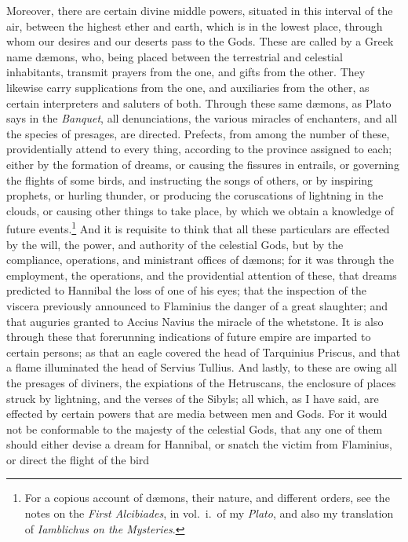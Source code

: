 \documentclass[twoside]{article}
\begin{document}
Moreover, there are certain divine middle powers, situated in this interval of
the air, between the highest ether and earth, which is in the lowest place,
through whom our desires and our deserts pass to the Gods.  These are called by
a Greek name d{\ae}mons, who, being placed between the terrestrial and
celestial inhabitants, transmit prayers from the one, and gifts from the other.
They likewise carry supplications from the one, and auxiliaries from the other,
as certain interpreters and saluters of both. Through these same d{\ae}mons, as
Plato says in the \textit{Banquet}, all denunciations, the various miracles of
enchanters, and all the species of presages, are directed.  Prefects, from
among the number of these, providentially attend to every thing, according to
the province assigned to each; either by the formation of dreams, or causing
the fissures in entrails, or governing the flights of some birds, and
instructing the songs of others, or by inspiring prophets, or hurling thunder,
or producing the coruscations of lightning in the clouds, or causing other
things to take place, by which we obtain a knowledge of future
events.\footnote{For a copious account of d{\ae}mons, their nature, and
different orders, see the notes on the \textit{First Alcibiades}, in vol.~i.~of
my \textit{Plato}, and also my translation of \textit{Iamblichus on the
Mysteries}.} And it is requisite to think that all these particulars are
effected by the will, the power, and authority of the celestial Gods, but by
the compliance, operations, and ministrant offices of d{\ae}mons; for it was
through the employment, the operations, and the providential attention of
these, that dreams predicted to Hannibal the loss of one of his eyes; that the
inspection of the viscera previously announced to Flaminius the danger of a
great slaughter; and that auguries granted to Accius Navius the miracle of the
whetstone. It is also through these that forerunning indications of future
empire are imparted to certain persons; as that an eagle covered the head of
Tarquinius Priscus, and that a flame illuminated the head of Servius Tullius.
And lastly, to these are owing all the presages of diviners, the expiations of
the Hetruscans, the enclosure of places struck by lightning, and the verses of
the Sibyls; all which, as I have said, are effected by certain powers that are
media between men and Gods.  For it would not be conformable to the majesty of
the celestial Gods, that any one of them should either devise a dream for
Hannibal, or snatch the victim from Flaminius, or direct the flight of the bird
\end{document}
